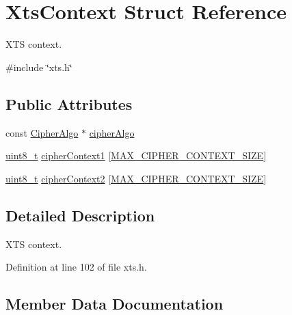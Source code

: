 \hypertarget{structXtsContext}{}\section{Xts\+Context Struct Reference}
\label{structXtsContext}


X\+TS context.  




{\ttfamily \#include \char`\"{}xts.\+h\char`\"{}}

\subsection*{Public Attributes}
\begin{DoxyCompactItemize}
\item 
const \hyperlink{structCipherAlgo}{Cipher\+Algo} $\ast$ \hyperlink{structXtsContext_a4cb31e6e5e5b201f619cd276dd08e95b}{cipher\+Algo}
\item 
\hyperlink{stdint_8h_aba7bc1797add20fe3efdf37ced1182c5}{uint8\+\_\+t} \hyperlink{structXtsContext_a64bb7668459fbcd40d7f7915e9a79a97}{cipher\+Context1} \mbox{[}\hyperlink{cyclone__crypto_2core_2crypto_8h_a99fb8f5b5cc906fd435df00c1720f7ad}{M\+A\+X\+\_\+\+C\+I\+P\+H\+E\+R\+\_\+\+C\+O\+N\+T\+E\+X\+T\+\_\+\+S\+I\+ZE}\mbox{]}
\item 
\hyperlink{stdint_8h_aba7bc1797add20fe3efdf37ced1182c5}{uint8\+\_\+t} \hyperlink{structXtsContext_afb74d825b35a35c34eff9ecbab9b49c4}{cipher\+Context2} \mbox{[}\hyperlink{cyclone__crypto_2core_2crypto_8h_a99fb8f5b5cc906fd435df00c1720f7ad}{M\+A\+X\+\_\+\+C\+I\+P\+H\+E\+R\+\_\+\+C\+O\+N\+T\+E\+X\+T\+\_\+\+S\+I\+ZE}\mbox{]}
\end{DoxyCompactItemize}


\subsection{Detailed Description}
X\+TS context. 

Definition at line 102 of file xts.\+h.



\subsection{Member Data Documentation}
\mbox{\label{structXtsContext_a4cb31e6e5e5b201f619cd276dd08e95b}} 
